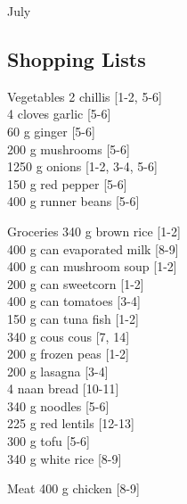 \begin{menu}{July}
    \subsection*{Shopping Lists}
      \begin{shoppinglist}{Vegetables}
      2  chillis {\scriptsize[1-2, 5-6]}\\
      4 cloves garlic {\scriptsize[5-6]}\\
      60 g ginger {\scriptsize[5-6]}\\
      200 g mushrooms {\scriptsize[5-6]}\\
      1250 g onions {\scriptsize[1-2, 3-4, 5-6]}\\
      150 g red pepper {\scriptsize[5-6]}\\
      400 g runner beans {\scriptsize[5-6]}\\
      \end{shoppinglist}%
      \begin{shoppinglist}{Groceries}
      340 g brown rice {\scriptsize[1-2]}\\
      400 g can evaporated milk {\scriptsize[8-9]}\\
      400 g can mushroom soup {\scriptsize[1-2]}\\
      200 g can sweetcorn {\scriptsize[1-2]}\\
      400 g can tomatoes {\scriptsize[3-4]}\\
      150 g can tuna fish {\scriptsize[1-2]}\\
      340 g cous cous {\scriptsize[7, 14]}\\
      200 g frozen peas {\scriptsize[1-2]}\\
      200 g lasagna {\scriptsize[3-4]}\\
      4  naan bread {\scriptsize[10-11]}\\
      340 g noodles {\scriptsize[5-6]}\\
      225 g red lentils {\scriptsize[12-13]}\\
      300 g tofu {\scriptsize[5-6]}\\
      340 g white rice {\scriptsize[8-9]}\\
      \end{shoppinglist}%
      \par\vfil %
      \begin{shoppinglist}{Meat}
      400 g chicken {\scriptsize[8-9]}\\
      \end{shoppinglist}%

\end{menu}
